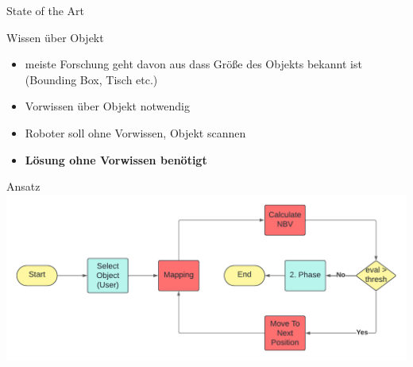 \documentclass[aspectratio=169]{beamer}
\begin{document}
\begin{frame}{State of the Art}
	\begin{block}{Wissen über Objekt}
		\begin{itemize}
			\item meiste Forschung geht davon aus dass Größe des Objekts bekannt ist (Bounding Box, Tisch etc.)
			\item Vorwissen über Objekt notwendig
			\item Roboter soll ohne Vorwissen, Objekt scannen
			\item \textbf{Lösung ohne Vorwissen benötigt}
		\end{itemize}
	\end{block}
\end{frame}

\begin{frame}{Ansatz}
	\centering
	\includegraphics[width=1.0\textwidth]{Graphics/flow_chart.pdf}
\end{frame}
\end{document}
